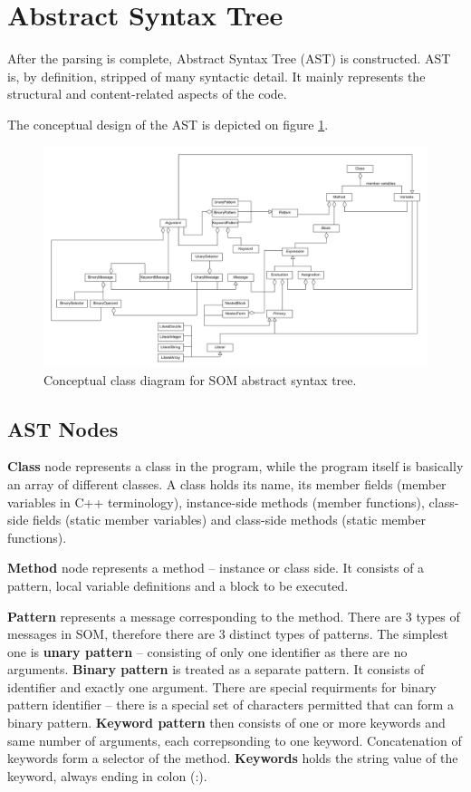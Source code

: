 \documentclass[thesis=M,english]{FITthesis}[2019/12/23]
\begin{document}
\section{Abstract Syntax Tree}
After the parsing is complete, Abstract Syntax Tree (AST) is constructed. AST is, by definition, stripped of many syntactic detail.
It mainly represents the structural and content-related aspects of the code.

The conceptual design of the AST is depicted on figure \ref{fig:ast_class_concept}.

\begin{figure}
	\centering
	\includegraphics[width=\textwidth]{media/ast/ast_concept.png}
	\caption{Conceptual class diagram for SOM abstract syntax tree.}
	\label{fig:ast_class_concept}
\end{figure}

\subsection{AST Nodes}
\textbf{Class} node represents a class in the program, while the program itself is basically an array of different classes. A class
holds its name, its member fields (member variables in C++ terminology), instance-side methods (member functions), class-side fields
(static member variables) and class-side methods (static member functions).

\textbf{Method} node represents a method -- instance or class side. It consists of a pattern, local variable definitions and a block
to be executed.

\textbf{Pattern} represents a message corresponding to the method. There are 3 types of messages in SOM, therefore there are 3 distinct
types of patterns. The simplest one is \textbf{unary pattern} -- consisting of only one identifier as there are no arguments. \textbf{Binary pattern}
is treated as a separate pattern. It consists of identifier and exactly one argument. There are special requirments for binary pattern identifier
-- there is a special set of characters permitted that can form a binary pattern. \textbf{Keyword pattern} then consists of one or more keywords and
same number of arguments, each correpsonding to one keyword. Concatenation of keywords form a selector of the method. \textbf{Keywords} holds the string
value of the keyword, always ending in colon (:).
\end{document}
